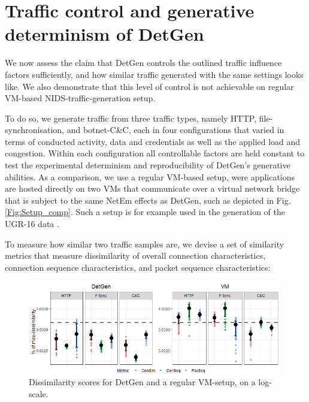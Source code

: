 \documentclass[runningheads]{llncs}
\begin{document}




\section{Traffic control and generative determinism of DetGen}\label{Sec:Determinism}
We now assess the claim that DetGen controls the outlined traffic influence factors sufficiently, and how similar traffic generated with the same settings looks like. We also demonstrate that this level of control is not achievable on regular VM-based NIDS-traffic-generation setup.

To do so, we generate traffic from three traffic types, namely HTTP, file-synchronisation, and botnet-C\&C, each in four configurations that varied in terms of conducted activity, data and credentials as well as the applied load and congestion. Within each configuration all controllable factors are held constant to test the experimental determinism and reproducibility of DetGen's generative abilities. 
As a comparison, we use a regular VM-based setup, were applications are hosted directly on two VMs that communicate over a virtual network bridge that is subject to the same NetEm effects as DetGen, such as depicted in Fig. \ref{Fig:Setup_comp}. Such a setup is for example used in the generation of the UGR-16 data \cite{macia2018ugr}.


To measure how similar two traffic samples are, we devise a set of similarity metrics that measure dissimilarity of overall connection characteristics, connection sequence characteristics, and packet sequence characteristics:


\begin{figure}
\centering
\includegraphics[width=0.99\textwidth]{images/Exp111.png}
\caption{Dissimilarity scores for DetGen and a regular VM-setup, on a log-scale.}\label{Fig:determ-metric}
\end{figure}
\end{document}
